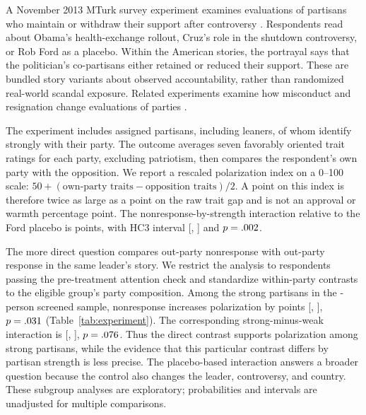 \documentclass[11pt]{article}
\begin{document}
A November 2013 MTurk survey experiment examines evaluations of partisans who maintain or withdraw their support after controversy \citep{ahler2026}. Respondents read about Obama's health-exchange rollout, Cruz's role in the shutdown controversy, or Rob Ford as a placebo. Within the American stories, the portrayal says that the politician's co-partisans either retained or reduced their support. These are bundled story variants about observed accountability, rather than randomized real-world scandal exposure. Related experiments examine how misconduct and resignation change evaluations of parties \citep{wolsky2022}.

The experiment includes \ExpAssignedN{} assigned partisans, including leaners, of whom \ExpStrongN{} identify strongly with their party. The outcome averages seven favorably oriented trait ratings for each party, excluding patriotism, then compares the respondent's own party with the opposition. We report a rescaled polarization index on a 0--100 scale: $50+(\text{own-party traits}-\text{opposition traits})/2$. A point on this index is therefore twice as large as a point on the raw trait gap and is not an approval or warmth percentage point. The nonresponse-by-strength interaction relative to the Ford placebo is \ExpArchivedInteractionEstimate{} points, with HC3 interval [\ExpArchivedInteractionLower, \ExpArchivedInteractionUpper] and $p=.002$.

The more direct question compares out-party nonresponse with out-party response in the same leader's story. We restrict the analysis to respondents passing the pre-treatment attention check and standardize within-party contrasts to the eligible group's party composition. Among the \ExpAttentionStrongN{} strong partisans in the \ExpAttentionN{}-person screened sample, nonresponse increases polarization by \ExpStrongResponseEstimate{} points [\ExpStrongResponseLower, \ExpStrongResponseUpper], $p=.031$ (Table~\ref{tab:experiment}). The corresponding strong-minus-weak interaction is \ExpModerationResponseEstimate{} [\ExpModerationResponseLower, \ExpModerationResponseUpper], $p=.076$. Thus the direct contrast supports polarization among strong partisans, while the evidence that this particular contrast differs by partisan strength is less precise. The placebo-based interaction answers a broader question because the control also changes the leader, controversy, and country. These subgroup analyses are exploratory; probabilities and intervals are unadjusted for multiple comparisons.
\end{document}
